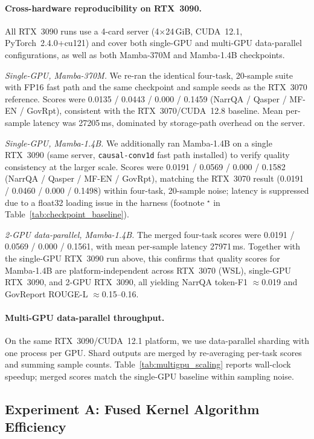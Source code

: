 \paragraph{Cross-hardware reproducibility on RTX~3090.}
All RTX~3090 runs use a 4-card server (4$\times$24\,GiB, CUDA~12.1, PyTorch~2.4.0+cu121) and cover both single-GPU and multi-GPU data-parallel configurations, as well as both Mamba-370M and Mamba-1.4B checkpoints.

\emph{Single-GPU, Mamba-370M.} We re-ran the identical four-task, 20-sample suite with FP16 fast path and the same checkpoint and sample seeds as the RTX~3070 reference. Scores were 0.0135 / 0.0443 / 0.000 / 0.1459 (NarrQA / Qasper / MF-EN / GovRpt), consistent with the RTX~3070/CUDA~12.8 baseline. Mean per-sample latency was 27205\,ms, dominated by storage-path overhead on the server.

\emph{Single-GPU, Mamba-1.4B.} We additionally ran Mamba-1.4B on a single RTX~3090 (same server, \texttt{causal-conv1d} fast path installed) to verify quality consistency at the larger scale. Scores were 0.0191 / 0.0569 / 0.000 / 0.1582 (NarrQA / Qasper / MF-EN / GovRpt), matching the RTX~3070 result (0.0191 / 0.0460 / 0.000 / 0.1498) within four-task, 20-sample noise; latency is suppressed due to a float32 loading issue in the harness (footnote $^\star$ in Table~\ref{tab:checkpoint_baseline}).

\emph{2-GPU data-parallel, Mamba-1.4B.} The merged four-task scores were 0.0191 / 0.0569 / 0.000 / 0.1561, with mean per-sample latency 27971\,ms. Together with the single-GPU RTX~3090 run above, this confirms that quality scores for Mamba-1.4B are platform-independent across RTX~3070 (WSL), single-GPU RTX~3090, and 2-GPU RTX~3090, all yielding NarrQA token-F1 $\approx$0.019 and GovReport ROUGE-L $\approx$0.15--0.16.

\paragraph{Multi-GPU data-parallel throughput.}
On the same RTX~3090/CUDA~12.1 platform, we use data-parallel sharding with one process per GPU. Shard outputs are merged by re-averaging per-task scores and summing sample counts. Table~\ref{tab:multigpu_scaling} reports wall-clock speedup; merged scores match the single-GPU baseline within sampling noise.

\subsection{Experiment A: Fused Kernel Algorithm Efficiency}
\label{sec:exp_fused_kernel}

